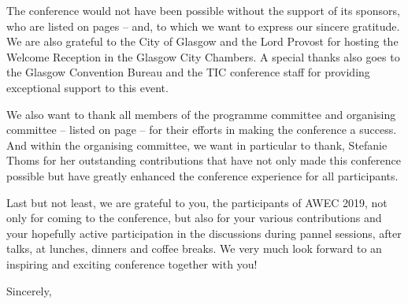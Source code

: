 \begin{multicols}{2}


The conference would not have been possible without the support of its sponsors, who are listed on pages \pageref{awec:sponsors}--\pageref{awec:sponsorsend} and, to which we want to express our sincere gratitude. We are also grateful to the City of Glasgow and the Lord Provost for hosting the Welcome Reception in the Glasgow City Chambers. A special thanks also goes to the Glasgow Convention Bureau and the TIC conference staff for providing exceptional support to this event.

We also want to thank all members of the programme committee and organising committee -- listed on page \pageref{awec:committees} -- for their efforts in making the conference a success. And within the organising committee, we want in particular to thank, Stefanie Thoms for her outstanding contributions that have not only made this conference possible but have greatly enhanced the conference experience for all participants.

Last but not least, we are grateful to you, the participants of AWEC 2019, not only for coming to the conference, but also for your various contributions and your hopefully active participation in the discussions during pannel sessions, after talks, at lunches, dinners and coffee breaks. We very much look forward to an inspiring and exciting conference together with you!

Sincerely,
\end{multicols}

\regularlinespacing

\vspace{1mm}

